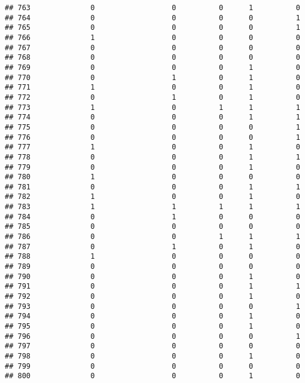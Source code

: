 \documentclass[
]{article}
\begin{document}
\begin{verbatim}
## 763              0                  0          0      1          0
## 764              0                  0          0      0          1
## 765              0                  0          0      0          1
## 766              1                  0          0      0          0
## 767              0                  0          0      0          0
## 768              0                  0          0      0          0
## 769              0                  0          0      1          0
## 770              0                  1          0      1          0
## 771              1                  0          0      1          0
## 772              0                  1          0      1          0
## 773              1                  0          1      1          1
## 774              0                  0          0      1          1
## 775              0                  0          0      0          1
## 776              0                  0          0      0          1
## 777              1                  0          0      1          0
## 778              0                  0          0      1          1
## 779              0                  0          0      1          0
## 780              1                  0          0      0          0
## 781              0                  0          0      1          1
## 782              1                  0          0      1          0
## 783              1                  1          1      1          1
## 784              0                  1          0      0          0
## 785              0                  0          0      0          0
## 786              0                  0          1      1          1
## 787              0                  1          0      1          0
## 788              1                  0          0      0          0
## 789              0                  0          0      0          0
## 790              0                  0          0      1          0
## 791              0                  0          0      1          1
## 792              0                  0          0      1          0
## 793              0                  0          0      0          1
## 794              0                  0          0      1          0
## 795              0                  0          0      1          0
## 796              0                  0          0      0          1
## 797              0                  0          0      0          0
## 798              0                  0          0      1          0
## 799              0                  0          0      0          0
## 800              0                  0          0      1          0

\end{verbatim}
\end{document}
